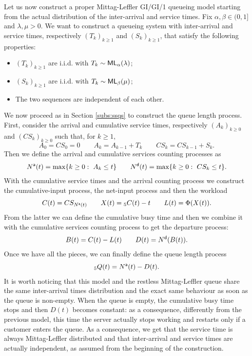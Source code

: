 \documentclass[]{amsart}
\numberwithin{equation}{section}
\theoremstyle{remark}
\theoremstyle{definition}
\begin{document}
Let us now construct a proper Mittag-Leffler GI/GI/1 queueing model starting from the actual distribution of the inter-arrival and service times. Fix $\alpha,\beta \in (0,1]$ and $\lambda,\mu>0$. We want to construct a queueing system with inter-arrival and service times, respectively $(T_k)_{k \ge 1}$ and $(S_k)_{k \ge 1}$, that satisfy the following properties:
\begin{itemize}
	\item $(T_k)_{k \ge 1}$ are i.i.d. with $T_k \sim {\sf ML}_\alpha(\lambda)$;
	\item $(S_k)_{k \ge 1}$ are i.i.d. with $T_k \sim {\sf ML}_\beta(\mu)$;
	\item The two sequences are independent of each other. 
\end{itemize}
We now proceed as in Section \ref{subs:ssqs} to construct the queue length process. First, consider the arrival and cumulative service times, respectively $(A_k)_{k \ge 0}$ and $(CS_k)_{k \ge 0}$ such that, for $k \ge 1$,
\begin{equation*}
	A_0=CS_0=0 \qquad A_k=A_{k-1}+T_k \qquad CS_k=CS_{k-1}+S_k.
\end{equation*}
Then we define the arrival and cumulative services counting processes as
\begin{equation*}
	N^{\sf a}(t)=\max\{k \ge 0: \ A_k \le t\} \qquad N^{\sf d}(t)=\max\{k \ge 0: \ CS_k \le t\}.
\end{equation*}
With the cumulative service times and the arrival counting process we construct the cumulative-input process, the net-input process and then the workload
\begin{equation*}
	C(t)=CS_{N^{\sf a}(t)} \qquad X(t)={}_5C(t)-t \qquad L(t)=\Phi(X(t)).
\end{equation*}
From the latter we can define the cumulative busy time and then we combine it with the cumulative services counting process to get the departure process:
\begin{equation*}
	B(t)=C(t)-L(t) \qquad D(t)=N^{\sf d}(B(t)).
\end{equation*}
Once we have all the pieces, we can finally define the queue length process
\begin{equation*}
	{}_5Q(t)=N^{\sf a}(t)-D(t).
\end{equation*}
It is worth noticing that this model and the restless Mittag-Leffler queue share the same inter-arrival times distribution and the exact same behaviour as soon as the queue is non-empty. When the queue is empty, the cumulative busy time stops and then $D(t)$ becomes constant: as a consequence, differently from the previous model, this time the server actually stops working and restarts only if a customer enters the queue. As a consequence, we get that the service time is always Mittag-Leffler distributed and that inter-arrival and service times are actually independent, as assumed from the beginning of the construction.
\end{document}
